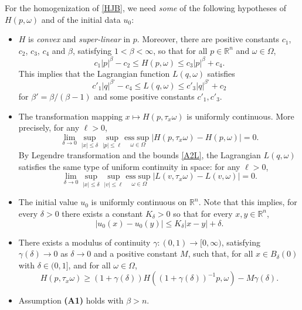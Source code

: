\documentclass[11pt,reqno]{amsart}
\theoremstyle{definition}
\theoremstyle{remark}
\numberwithin{equation}{section}
\begin{document}
For the homogenization of \eqref{HJB}, we need \emph{some} of the following hypotheses of $H(p,\omega)$ and of the initial data $u_0$:
\begin{itemize}
\item[{\bf (A1)}] $H$ is \emph{convex} and \emph{super-linear} in $p$. Moreover, there are positive constants $c_1$, $c_2$, $c_3$, $c_4$ and $\beta$, satisfying $1< \beta < \infty$, so that for all $p\in \mathbb{R}^n$ and $\omega\in\Omega$, 
\begin{equation}\label{A1H}
    c_1 |p|^{\beta} - c_2 \leq H(p,\omega) \leq c_3 |p|^{\beta} + c_4.
\end{equation}
This implies that the Lagrangian function $L(q,\omega)$ satisfies 
\begin{equation}\label{A2L}
    c'_1|q|^{\beta'} - c_4 \leq L(q,\omega) \leq c'_3 |q|^{\beta'} + c_2
\end{equation}
for $\beta' = \beta/(\beta-1)$ and some positive constants $c'_1,c'_3$.

\item[{\bf (A2)}] The transformation mapping $x\mapsto H(p,\tau_{x}\omega)$ is uniformly continuous. More precisely, for any $\ell >0$,
\begin{equation}
    \lim_{\delta\to 0}\sup_{|x| \leq \delta}\sup_{|p| \leq \ell} \underset{\omega \in \Omega}{\mathrm{ess}\sup} |H(p,\tau_{x}\omega) - H(p,\omega)| = 0.
\end{equation}
By Legendre transformation and the bounds \eqref{A2L}, the Lagrangian $L(q,\omega)$ satisfies the same type of uniform continuity in space: for any $\ell>0$,
\begin{equation}
    \lim_{\delta\to 0}\sup_{|x| \leq \delta}\sup_{|v| \leq \ell} \underset{\omega \in \Omega}{\mathrm{ess}\sup} |L(v,\tau_{x}\omega) - L(v,\omega)| = 0.
\end{equation}


\item[{\bf (A3)}] The initial value $u_0$ is uniformly continuous on $\mathbb{R}^n$. Note that this implies, for every $\delta>0$ there exists a constant $K_{\delta}>0$ so that for every $x,y \in\mathbb{R}^n$,
\begin{equation}\label{u0C}
    |u_0(x)-u_{0}(y)| \leq K_{\delta} |x-y|+ \delta.
\end{equation}

\item[{\bf (B)}] There exists a modulus of continuity $\gamma:(0,1)\to [0,\infty)$, satisfying $\gamma(\delta)\to 0$ as $\delta\to 0$ and a positive constant $M$, such that, for all $x\in B_\delta(0)$ with $\delta \in (0,1]$, and for all $\omega\in\Omega$,
\begin{equation}\label{AHd}
    H(p,\tau_{x}\omega) \geq (1 + \gamma(\delta))H((1+\gamma(\delta))^{-1}p,\omega) - M\gamma(\delta).
\end{equation}


\item[{\bf (C)}] Assumption {\bf (A1)} holds with $\beta > n$.
\end{itemize}
\end{document}
